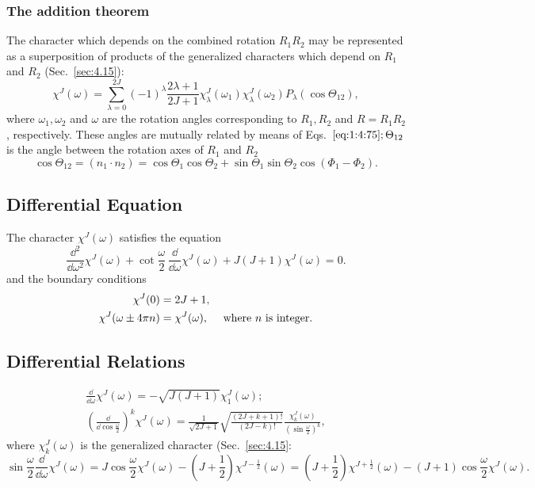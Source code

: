 \subsubsection{The addition theorem}
The character which depends on the combined rotation $R_{1} R_{2}$ may be represented as a superposition of products of the generalized characters which depend on $R_{1}$ and $R_{2}$ (Sec.~\ref{sec:4.15}):
\begin{equation}
\chi^{J}(\omega)=\sum_{\lambda=0}^{2 J}(-1)^{\lambda} \frac{2 \lambda+1}{2 J+1} \chi_{\lambda}^{J}\left(\omega_{1}\right) \chi_{\lambda}^{J}\left(\omega_{2}\right) P_{\lambda}\left(\cos \Theta_{12}\right), \label{eq:4:14:24}
\end{equation}
where $\omega_{1}, \omega_{2}$ and $\omega$ are the rotation angles corresponding to $R_{1}, R_{2}$ and $R=R_{1} R_{2}$, respectively. These angles are mutually related by means of Eqs.~$\eqref{eq:1:4:75} ; \Theta_{12}$ is the angle between the rotation axes of $R_{1}$ and $R_{2}$
\begin{equation}
\cos \Theta_{12}=\left(n_{1} \cdot n_{2}\right)=\cos \Theta_{1} \cos \Theta_{2}+\sin \Theta_{1} \sin \Theta_{2} \cos \left(\Phi_{1}-\Phi_{2}\right) .\label{eq:4:14:25}
\end{equation}
\subsection{Differential Equation}\label{sec:4.14.4}
The character $\chi^{J}(\omega)$ satisfies the equation
\begin{equation}
\frac{\dd^{2}}{\dd \omega^{2}} \chi^{J}(\omega)+\cot \frac{\omega}{2} \, \frac{\dd}{\dd \omega} \chi^{J}(\omega)+J(J+1) \chi^{J}(\omega)=0.\label{eq:4:14:26}
\end{equation}
and the boundary conditions
\begin{align}
\chi^{J}(0) & =2 J+1 , \notag\\
\chi^{J}(\omega \pm 4 \pi n) & =\chi^{J}(\omega), \quad \text { where $n$ is integer}. \label{eq:4:14:27}
\end{align}
\subsection{Differential Relations}\label{sec:4.14.5}
\begin{gather}
\frac{\dd}{\dd \omega} \chi^{J}(\omega)=-\sqrt{J(J+1)} \chi_{1}^{J}(\omega)  ;\label{eq:4:14:28}\\
\left(\frac{\dd}{\dd \cos \frac{\omega}{2}}\right)^{k} \chi^{J}(\omega)=\frac{1}{\sqrt{2 J+1}} \sqrt{\frac{(2 J+k+1)!}{(2 J-k)!}} \frac{\chi_{k}^{J}(\omega)}{\left(\sin \frac{\omega}{2}\right)^{k}} ,\label{eq:4:14:29}
\end{gather}
where $\chi_{k}^{J}(\omega)$ is the generalized character (Sec.~\ref{sec:4.15}:
\begin{equation}
\sin \frac{\omega}{2} \frac{\dd}{\dd \omega} \chi^{J}(\omega)=J \cos \frac{\omega}{2} \chi^{J}(\omega)-\left(J+\frac{1}{2}\right) \chi^{J-\frac{1}{2}}(\omega)=\left(J+\frac{1}{2}\right) \chi^{J+\frac{1}{2}}(\omega)-(J+1) \cos \frac{\omega}{2} \chi^{J}(\omega) .\label{eq:4:14:30}
\end{equation}
